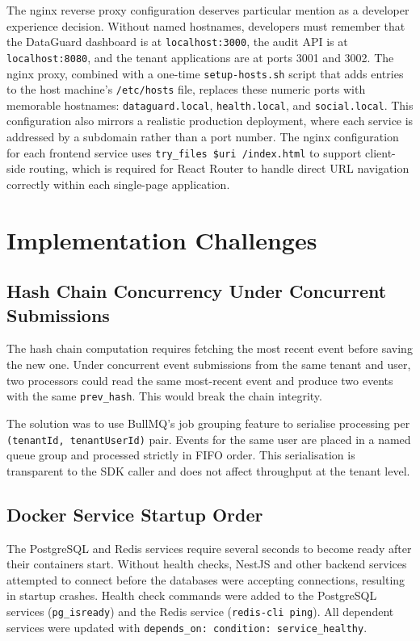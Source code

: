 \documentclass[a4paper,12pt,onecolumn]{report}
\begin{document}
The nginx reverse proxy configuration deserves particular mention as a developer experience decision.
Without named hostnames, developers must remember that the DataGuard dashboard is at \texttt{localhost:3000}, the audit API is at \texttt{localhost:8080}, and the tenant applications are at ports 3001 and 3002.
The nginx proxy, combined with a one-time \texttt{setup-hosts.sh} script that adds entries to the host machine's \texttt{/etc/hosts} file, replaces these numeric ports with memorable hostnames: \texttt{dataguard.local}, \texttt{health.local}, and \texttt{social.local}.
This configuration also mirrors a realistic production deployment, where each service is addressed by a subdomain rather than a port number.
The nginx configuration for each frontend service uses \texttt{try\_files \$uri /index.html} to support client-side routing, which is required for React Router to handle direct URL navigation correctly within each single-page application.

\section{Implementation Challenges}

\subsection{Hash Chain Concurrency Under Concurrent Submissions}

The hash chain computation requires fetching the most recent event before saving the new one.
Under concurrent event submissions from the same tenant and user, two processors could read the same most-recent event and produce two events with the same \texttt{prev\_hash}.
This would break the chain integrity.

The solution was to use BullMQ's job grouping feature to serialise processing per \texttt{(tenantId, tenantUserId)} pair.
Events for the same user are placed in a named queue group and processed strictly in FIFO order.
This serialisation is transparent to the SDK caller and does not affect throughput at the tenant level.

\subsection{Docker Service Startup Order}

The PostgreSQL and Redis services require several seconds to become ready after their containers start.
Without health checks, NestJS and other backend services attempted to connect before the databases were accepting connections, resulting in startup crashes.
Health check commands were added to the PostgreSQL services (\texttt{pg\_isready}) and the Redis service (\texttt{redis-cli ping}).
All dependent services were updated with \texttt{depends\_on: condition: service\_healthy}.
\end{document}
